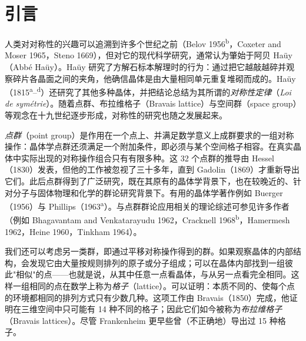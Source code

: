 \section{引言}

人类对对称性的兴趣可以追溯到许多个世纪之前（Belov 1956\textsuperscript{b}，Coxeter and Moser 1965，Steno 1669），但对它的现代科学研究，通常认为肇始于阿贝 Haüy（Abbé Haüy）。Haüy 研究了方解石标本解理时的行为：通过把它越敲越碎并观察碎片各晶面之间的夹角，他确信晶体是由大量相同单元重复堆砌而成的。Haüy（1815\textsuperscript{a}–\textsuperscript{d}）还研究了其他多种晶体，并把结论总结为其所谓的\textit{对称性定律}（\textit{Loi de symétrie}）。随着点群、布拉维格子（Bravais lattice）与空间群（space group）等观念在十九世纪逐步形成，对称性的研究也随之发展起来。

\textit{点群}（point group）是作用在一个点上、并满足数学意义上成群要求的一组对称操作：晶体学点群还须满足一个附加条件，即必须与某个空间格子相容。在真实晶体中实际出现的对称操作组合只有有限多种。这 32 个点群的推导由 Hessel（1830）发表，但他的工作被忽视了三十多年，直到 Gadolin（1869）才重新导出它们。此后点群得到了广泛研究，既在其原有的晶体学背景下，也在较晚近的、针对分子与固体物理和化学的群论研究背景下。有用的晶体学著作例如 Buerger（1956）与 Phillips（1963\textsuperscript{a}）。与点群群论应用相关的理论综述可参见许多作者（例如 Bhagavantam and Venkatarayudu 1962，Cracknell 1968\textsuperscript{b}，Hamermesh 1962，Heine 1960，Tinkham 1964）。

我们还可以考虑另一类群，即通过平移对称操作得到的群。如果观察晶体的内部结构，会发现它由大量按规则排列的原子或分子组成；可以在晶体内部找到一组彼此"相似"的点——也就是说，从其中任意一点看晶体，与从另一点看完全相同。这样一组相同的点在数学上称为\textit{格子}（lattice）。可以证明：本质不同的、使每个点的环境都相同的排列方式只有少数几种。这项工作由 Bravais（1850）完成，他证明在三维空间中只可能有 14 种不同的格子；因此它们如今被称为\textit{布拉维格子}（Bravais lattices）。尽管 Frankenheim 更早些曾（不正确地）导出过 15 种格子。

